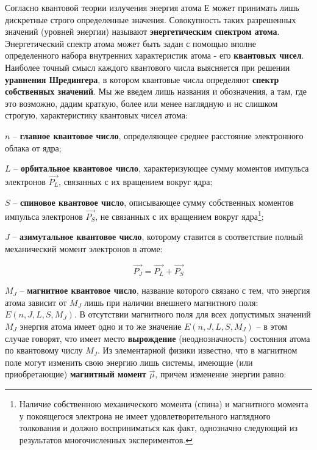 Согласно квантовой теории излучения энергия атома $Е$ может принимать лишь дискретные строго определенные значения. Совокупность таких разрешенных значений (уровней энергии) называют \textbf{энергетическим спектром атома}. Энергетический спектр атома может быть задан с помощью вполне определенного набора внутренних характеристик атома - его \textbf{квантовых чисел}. Наиболее точный смысл каждого квантового числа выясняется при решении \textbf{уравнения Шредингера}, в котором квантовые числа определяют \textbf{спектр собственных значений}. Мы же введем лишь названия и обозначения, а там, где это возможно, дадим краткую, более или менее наглядную и нс слишком строгую, характеристику квантовых чисел атома:

$n$ -- \textbf{главное квантовое число}, определяющее среднее расстояние электронного облака от ядра;

$L$ -- \textbf{орбитальное квантовое число}, характеризующее сумму моментов импульса электронов $\overrightarrow{P_L}$, связанных с их вращением вокруг ядра;

$S$ -- \textbf{спиновое квантовое число}, описывающее сумму собственных моментов импульса электронов $\overrightarrow{P_S}$, не связанных с их вращением вокруг ядра\footnote{Наличие собственною механического момента (спина) и магнитного момента у покоящегося электрона не имеет удовлетворительного наглядного толкования и должно восприниматься как факт, однозначно следующий из результатов многочисленных экспериментов.};

$J$ -- \textbf{азимутальное квантовое число}, которому ставится в соответствие полный механический момент электронов в атоме:

\begin{equation}
\overrightarrow{P_J}=\overrightarrow{P_L}+\overrightarrow{P_S}
\label{eq:1}
\end{equation}

$M_J$ -- \textbf{магнитное квантовое число}, название которого связано с тем, что энергия атома зависит от $M_J$ лишь при наличии внешнего магнитного поля: $E(n,J,L,S,M_J)$. В отсутствии магнитного поля для всех допустимых значений $M_J$ энергия атома имеет одно и то же значение $E(n,J,L,S,M_J)$ -- в этом случае говорят, что имеет место \textbf{вырождение} (неоднозначность) состояния атома по квантовому числу $M_J$. Из элементарной физики известно, что в магнитном поле могут изменить свою энергию лишь системы, имеющие (или приобретающие) \textbf{магнитный момент} $\vec{\mu}$, причем изменение энергии равно:

